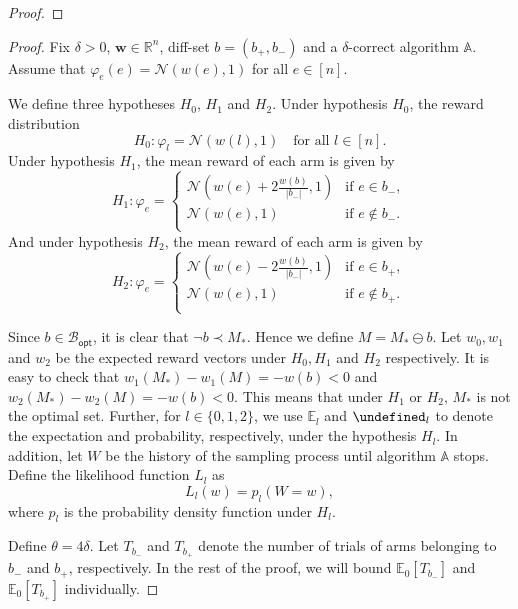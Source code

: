 \documentclass{article}
\newcommand{\Rew}{\varphi}
\newcommand{\E}{\mathbb E}
\newcommand{\diffvalid}{\prec}
\newcommand{\RR}{\mathbb R}
\newcommand{\Bopt}{\mathcal B_{\mathsf{opt}}}
\let\Pr\undefined
\DeclareMathOperator{\Pr}{Pr}
\renewcommand{\vec}[1]{\boldsymbol{#1}}
\begin{document}
\begin{spacing}{1.1}
\begin{proof}
\end{proof}

\begin{proof}
Fix $\delta >0$, $\vec w\in \RR^{n}$, diff-set $b=(b_+,b_-)$ and a $\delta$-correct algorithm $\mathbb A$.
Assume that $\Rew_e(e)=\mathcal N(w(e),1)$ for all $e\in[n]$.



We define three hypotheses $H_0$, $H_1$ and $H_2$. 
Under hypothesis $H_0$, the reward distribution 
$$
H_0: \Rew_l = \mathcal N(w(l),1) \quad \text{for all } l \in [n].
$$
Under hypothesis $H_1$, the mean reward of each arm is given by 
$$
H_1: \Rew_e = \begin{cases}
	\mathcal N\left(w(e)+2\frac{w(b)}{|b_-|},1\right) & \text{if } e\in b_-,\\
	\mathcal N(w(e), 1) & \text{if } e\not\in b_-.\\
    \end{cases}
$$
And under hypothesis $H_2$, the mean reward of each arm is given by 
$$
H_2: \Rew_e = \begin{cases}
	\mathcal N\left(w(e)-2\frac{w(b)}{|b_-|},1\right)  & \text{if } e\in b_+,\\
	\mathcal N(w(e), 1)  & \text{if } e\not\in b_+.\\
    \end{cases}
$$

Since $b\in \Bopt$, it is clear that $\neg b \diffvalid M_*$. Hence we define $M = M_* \ominus b$.
Let $w_0, w_1$ and $w_2$ be the expected reward vectors under $H_0,H_1$ and $H_2$ respectively.
It is easy to check that 
$w_1(M_*)-w_1(M) = -w(b) < 0$ and
$w_2(M_*)-w_2(M) = -w(b) < 0$.
This means that under $H_1$ or $H_2$, $M_*$ is not the optimal set.
Further, for $l\in \{0,1,2\}$, we use $\E_l$ and $\Pr_l$ to denote the expectation and probability, respectively, under the hypothesis $H_l$.
In addition, let $W$ be the history of the sampling process until algorithm $\mathbb A$ stops.
Define the likelihood function $L_l$ as 
$$
L_l(w) = p_l(W=w),
$$
where $p_l$ is the probability density function under $H_l$.


Define $\theta=4\delta$.
Let $T_{b_-}$ and $T_{b_+}$ denote the number of trials of arms belonging to $b_-$ and $b_+$, respectively. 
In the rest of the proof, we will bound $\E_0[T_{b_-}]$ and $\E_0[T_{b_+}]$ individually.




\end{proof}
\end{spacing}
\end{document}
